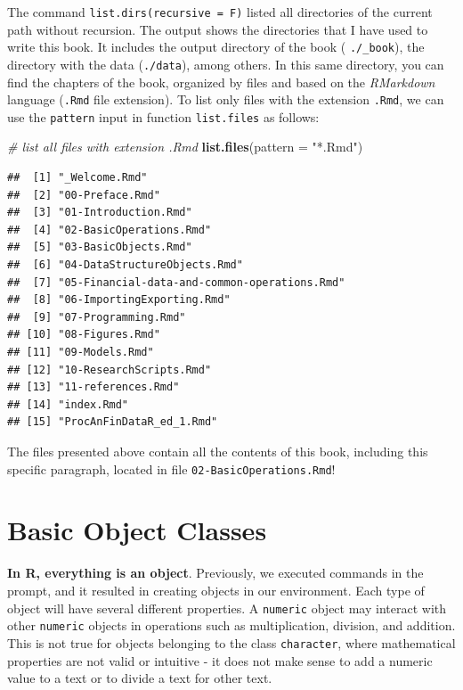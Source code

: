 \documentclass[11pt,]{book}
\newenvironment{Shaded}{\begin{snugshade}}{\end{snugshade}}
\newcommand{\KeywordTok}[1]{\textcolor[rgb]{0.27,0.27,0.27}{\textbf{#1}}}
\newcommand{\DataTypeTok}[1]{\textcolor[rgb]{0.27,0.27,0.27}{#1}}
\newcommand{\StringTok}[1]{\textcolor[rgb]{0.5,0.5,0.5}{#1}}
\newcommand{\CommentTok}[1]{\textcolor[rgb]{0.56,0.35,0.01}{\textit{#1}}}
\newcommand{\NormalTok}[1]{#1}
\begin{document}
The command \texttt{list.dirs(recursive\ =\ F)} listed all directories
of the current path without recursion. The output shows the directories
that I have used to write this book. It includes the output directory of
the book ( \texttt{./\_book}), the directory with the data
(\texttt{./data}), among others. In this same directory, you can find
the chapters of the book, organized by files and based on the
\emph{RMarkdown} language (\texttt{.Rmd} file extension). To list only
files with the extension \texttt{.Rmd}, we can use the \texttt{pattern}
input in function \texttt{list.files} as follows:

\begin{Shaded}
\begin{Highlighting}[]
\CommentTok{# list all files with extension .Rmd}
\KeywordTok{list.files}\NormalTok{(}\DataTypeTok{pattern =} \StringTok{"*.Rmd"}\NormalTok{)}
\end{Highlighting}
\end{Shaded}

\begin{verbatim}
##  [1] "_Welcome.Rmd"                               
##  [2] "00-Preface.Rmd"                             
##  [3] "01-Introduction.Rmd"                        
##  [4] "02-BasicOperations.Rmd"                     
##  [5] "03-BasicObjects.Rmd"                        
##  [6] "04-DataStructureObjects.Rmd"                
##  [7] "05-Financial-data-and-common-operations.Rmd"
##  [8] "06-ImportingExporting.Rmd"                  
##  [9] "07-Programming.Rmd"                         
## [10] "08-Figures.Rmd"                             
## [11] "09-Models.Rmd"                              
## [12] "10-ResearchScripts.Rmd"                     
## [13] "11-references.Rmd"                          
## [14] "index.Rmd"                                  
## [15] "ProcAnFinDataR_ed_1.Rmd"
\end{verbatim}

The files presented above contain all the contents of this book,
including this specific paragraph, located in file
\texttt{02-BasicOperations.Rmd}!

\chapter{Basic Object Classes}\label{BasicObjects}

\textbf{In R, everything is an object}. Previously, we executed commands
in the prompt, and it resulted in creating objects in our environment.
Each type of object will have several different properties. A
\texttt{numeric} object may interact with other \texttt{numeric} objects
in operations such as multiplication, division, and addition. This is
not true for objects belonging to the class \texttt{character}, where
mathematical properties are not valid or intuitive - it does not make
sense to add a numeric value to a text or to divide a text for other
text.
\end{document}
